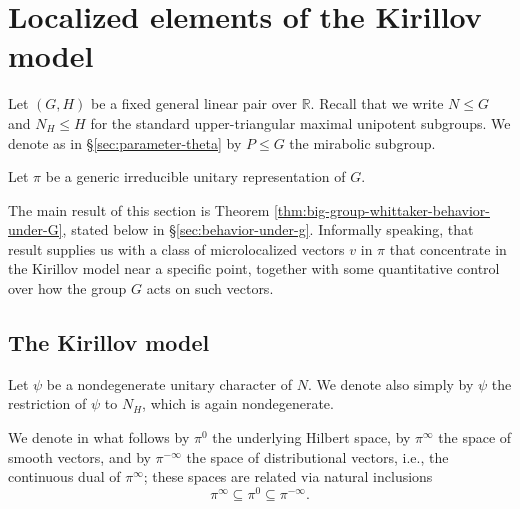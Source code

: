 \documentclass[reqno]{amsart}
\theoremstyle{plain} \newtheorem{theorem} {Theorem}
\theoremstyle{definition} \newtheorem{definition} [theorem] {Definition}
\theoremstyle{itplain} %
\numberwithin{equation}{section}
\numberwithin{theorem}{section}
\renewcommand{\leq}{\leqslant}
\begin{document}
\section{Localized elements of the Kirillov model}\label{sec:asympt-analys-local}
Let $(G,H)$ be a fixed general linear pair over $\mathbb{R}$.  Recall that we write $N \leq G$ and $N_H \leq H$ for the standard upper-triangular maximal unipotent subgroups.  We denote as in \S\ref{sec:parameter-theta} by $P \leq G$ the mirabolic subgroup.


Let $\pi$ be a generic irreducible unitary representation of $G$.

The main result of this section is Theorem \ref{thm:big-group-whittaker-behavior-under-G}, stated below in \S\ref{sec:behavior-under-g}.  Informally speaking,
that result supplies us with a class of microlocalized vectors $v$ in $\pi$ that concentrate in the Kirillov model near a specific
point, together with some quantitative control over how the group $G$ acts on such vectors.


\subsection{The Kirillov model}\label{sec:kirillov-model}
Let $\psi$ be a nondegenerate unitary character of $N$.  We denote also simply by $\psi$ the restriction of $\psi$ to $N_H$, which is again nondegenerate.

We denote in what follows by $\pi^0$ the underlying Hilbert space, by $\pi^\infty$ the space of smooth vectors, and by $\pi^{-\infty}$ the space of distributional vectors, i.e., the continuous dual of $\pi^\infty$; these spaces are related via  natural inclusions
\begin{equation*}
  \pi^\infty \subseteq \pi^0 \subseteq \pi^{-\infty}.
\end{equation*}
\end{document}
